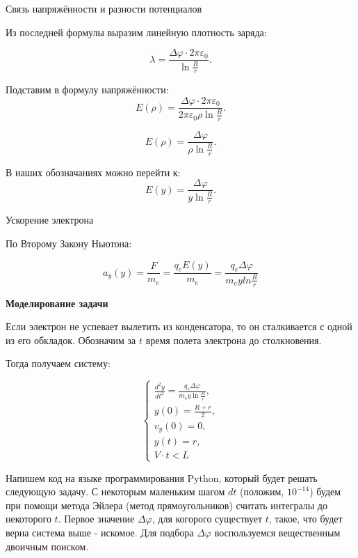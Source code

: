 \documentclass[12pt]{article}
\begin{document}
    \begin{flushleft}
        {\large Связь напряжённости и разности потенциалов}
    \end{flushleft}

    Из последней формулы выразим линейную плотность заряда:

   \[
   \lambda = \frac{\Delta \varphi \cdot 2 \pi \varepsilon_0}{\ln\frac{R}{r}}.
   \]

    Подставим в формулу напряжённости:  
   \[
   E(\rho) = \frac{\Delta \varphi \cdot 2 \pi \varepsilon_0}{2 \pi \varepsilon_0 \rho \ln\frac{R}{r}}.
   \]
  
   \[
   E(\rho) = \frac{\Delta \varphi}{\rho \ln\frac{R}{r}}.
   \] 

   В наших обозначаниях можно перейти к:
   \[
   E(y) = \frac{\Delta \varphi}{y \ln\frac{R}{r}}.
   \]

   \begin{flushleft}
        {\large Ускорение электрона}
    \end{flushleft}

    По Второму Закону Ньютона:

    \[
    a_y(y) = \frac{F}{m_e} = \frac{q_eE(y)}{m_e} = \frac{q_e\Delta \varphi}{m_eyln\frac{R}{r}}
    \]

    \clearpage

    \begin{flushleft}
        {\large \textbf{Моделирование задачи}}
    \end{flushleft}

    Если электрон не успевает вылетить из конденсатора, то он сталкивается с одной из его обкладок. Обозначим за $t$ время полета электрона до столкновения.

    Тогда получаем систему:

    \[
    \begin{cases}
        \frac{d^2 y}{dt^2} = \frac{q_e \Delta \varphi}{m_ey\ln\frac{R}{r}}, \\
        y(0) = \frac{R + r}{2}, \\
        v_y(0) = 0, \\
        y(t) = r, \\
        V \cdot t < L
    \end{cases}
    \]

    Напишем код на языке программирования Python, который будет решать следующую задачу. С некоторым маленьким шагом $dt$ (положим, $10^{-14}$) будем при помощи метода Эйлера (метод прямоугольников) считать интегралы до некоторого $t$. Первое значение $\Delta \varphi$, для когорого существует $t$, такое, что будет верна система выше - искомое. Для подбора $\Delta \varphi$ воспользуемся вещественным двоичным поиском.
\end{document}
